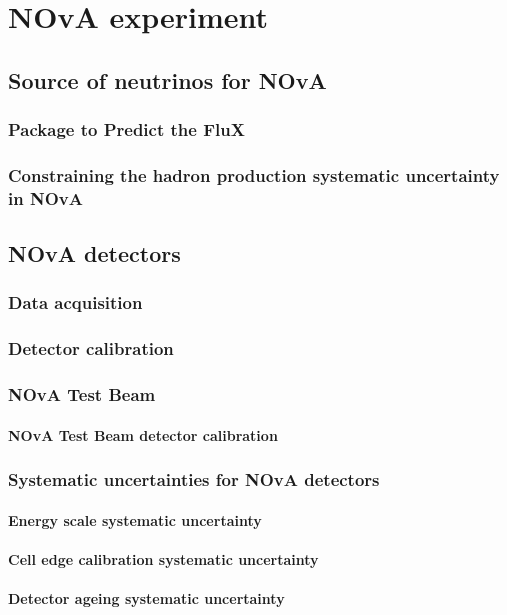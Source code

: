 \chapter{NOvA experiment}\label{chapterNOvA}


\section{Source of neutrinos for NOvA}

\subsection{Package to Predict the FluX}

\subsection{Constraining the hadron production systematic uncertainty in NOvA}

\section{NOvA detectors}

\subsection{Data acquisition}

\subsection{Detector calibration}

\subsection{NOvA Test Beam}

\subsubsection{NOvA Test Beam detector calibration}

\subsection{Systematic uncertainties for NOvA detectors}

\subsubsection{Energy scale systematic uncertainty}

\subsubsection{Cell edge calibration systematic uncertainty}

\subsubsection{Detector ageing systematic uncertainty}

